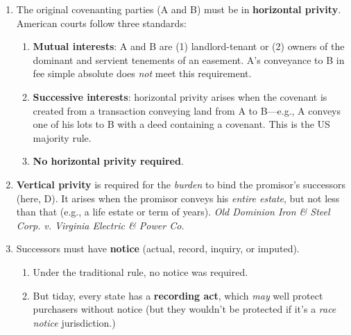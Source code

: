 \begin{enumerate}
\begin{enumerate}
        affirmative covenants clog titles.\footnote{Casebook p. 873.}
        \item Covenants to pay dues to homeowner associations are almost 
        always enforced.\footnote{Casebook p. 874.}
        \item ``The touch and concern requirement has been criticized as being 
        vague and unpredictable, based upon obscure reasoning, and interfering 
        with the intent of the parties.''\footnote{Casebook p. 874.}
        \item The Restatement (Third) supersedes the touch and concern 
        requirement and assumes that covenants are valid unless it violates 
        public policy. It allows subsequent invalidity based on changed 
        circumstances.\footnote{Casebook pp. 874--75.}
    \end{enumerate}
    \item The original covenanting parties (A and B) must be in 
    \textbf{horizontal privity}. American courts follow three standards:
    \begin{enumerate}
        \item \textbf{Mutual interests}: A and B are (1) landlord-tenant or 
        (2) owners of the dominant and servient tenements of an easement. A's 
        conveyance to B in fee simple absolute does \emph{not} meet this 
        requirement.
        \item \textbf{Successive interests}: horizontal privity arises when 
        the covenant is created from a transaction conveying land from A to 
        B---e.g., A conveys one of his lots to B with a deed containing a 
        covenant. This is the US majority rule.
        \item \textbf{No horizontal privity required}.
    \end{enumerate}
    \item \textbf{Vertical privity} is required for the \emph{burden} to bind 
    the promisor's successors (here, D). It arises when the promisor conveys 
    his \emph{entire estate}, but not less than that (e.g., a life estate or 
    term of years). \emph{Old Dominion Iron \& Steel Corp. v. Virginia 
    Electric \& Power Co.}
    \item Successors must have \textbf{notice} (actual, record, inquiry, or 
    imputed).
    \begin{enumerate}
        \item  Under the traditional rule, no notice was required.
        \item But tiday, every state has a \textbf{recording act}, which 
        \emph{may} well protect purchasers without notice (but they wouldn't 
        be protected if it's a \emph{race notice} jurisdiction.)
    \end{enumerate}
\end{enumerate}

